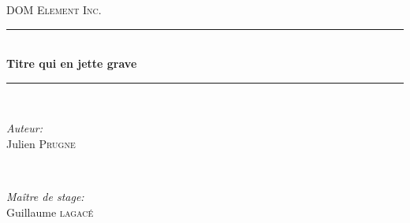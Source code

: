 \documentclass[11pt, a4paper ]{article}
\begin{document}
\begin{titlepage}

\newcommand{\HRule}{\rule{\linewidth}{0.5mm}} %

\center %


\textsc{\LARGE DOM Element Inc.}\\[1.5cm] %


\HRule \\[0.4cm]
{ \huge \bfseries Titre qui en jette grave }\\[0.4cm] %
\HRule \\[1.5cm]


\begin{minipage}{0.4\textwidth}
\begin{flushleft} \large
\emph{Auteur:}\\
Julien  \textsc{Prugne} %
\end{flushleft}
\end{minipage}
~
\begin{minipage}{0.4\textwidth}
\begin{flushright} \large
\emph{Maître de stage:} \\
Guillaume \textsc{lagacé} %
\end{flushright}
\end{minipage}\\[2cm]



\end{titlepage}
\end{document}
